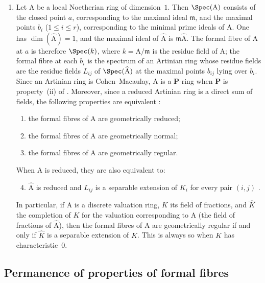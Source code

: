 \begin{remarks}[7.3.19]
\begin{enumerate}[label=\emph{\roman*)}]
  \item Let $\mathrm{A}$ be a local Noetherian ring of dimension~$1$.
  Then $\Spec(\mathrm{A})$ consists of the closed point $a$, corresponding to the maximal ideal $\mathfrak{m}$, and the maximal points $b_i$ ($1\leqslant i\leqslant r$), corresponding to the minimal prime ideals of $\mathrm{A}$.
  One has $\dim(\widehat{\mathrm{A}})=1$, and the maximal ideal of $\widehat{\mathrm{A}}$ is $\mathfrak{m}\widehat{\mathrm{A}}$.
  The formal fibre of $\mathrm{A}$ at $a$ is therefore $\Spec(k)$, where $k=\mathrm{A}/\mathfrak{m}$ is the residue field of $\mathrm{A}$; the formal fibre at each $b_i$ is the spectrum of an Artinian ring whose residue fields are the residue fields $L_{ij}$ of $\Spec(\widehat{\mathrm{A}})$ at the maximal points $b_{ij}$ lying over $b_i$.
  Since an Artinian ring is Cohen--Macaulay, $\mathrm{A}$ is a $\boldsymbol{P}$-ring when $\boldsymbol{P}$ is property~(ii) of .
  Moreover, since a reduced Artinian ring is a direct sum of fields, the following properties are equivalent :
  \begin{enumerate}[label=\emph{\alph*)}]
    \item the formal fibres of $\mathrm{A}$ are geometrically reduced;
    \item the formal fibres of $\mathrm{A}$ are geometrically normal;
    \item the formal fibres of $\mathrm{A}$ are geometrically regular.
  \end{enumerate}
  When $\mathrm{A}$ is reduced, they are also equivalent to:
  \begin{enumerate}[label=\emph{\alph*)}]
    \setcounter{enumii}{3}
    \item $\widehat{\mathrm{A}}$ is reduced and $L_{ij}$ is a separable extension of $K_i$ for every pair $(i,j)$ .
  \end{enumerate}
  In particular, if $\mathrm{A}$ is a discrete valuation ring, $K$ its field of fractions, and $\widehat{K}$ the completion of $K$ for the valuation corresponding to $\mathrm{A}$ (the field of fractions of $\widehat{\mathrm{A}}$), then the formal fibres of $\mathrm{A}$ are geometrically regular if and only if $\widehat{K}$ is a separable extension of $K$.
  This is always so when $K$ has characteristic~$0$.
\end{enumerate}
\end{remarks}


\subsection{Permanence of properties of formal fibres}
\label{subsection:IV.7.4}


